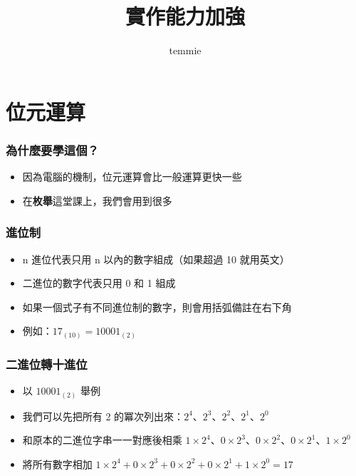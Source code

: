 \documentclass[mathserif]{beamer}
\title{實作能力加強}
\author{temmie}
\date{}
\begin{document}
\begin{frame}
    \titlepage
\end{frame}

\begin{frame}
    \tableofcontents
\end{frame}

\section{位元運算}

\begin{frame}
    \frametitle{為什麼要學這個？}
    \begin{itemize}
        \item 因為電腦的機制，位元運算會比一般運算更快一些
        \item 在\textbf{枚舉}這堂課上，我們會用到很多
    \end{itemize}
\end{frame}

\begin{frame}
    \frametitle{進位制}
    \begin{itemize}
        \item n 進位代表只用 n 以內的數字組成（如果超過 10 就用英文）
        \item 二進位的數字代表只用 0 和 1 組成
        \item<2-> 如果一個式子有不同進位制的數字，則會用括弧備註在右下角
        \item<2-> 例如：$17_{(10)}=10001_{(2)}$
    \end{itemize}
\end{frame}

\begin{frame}
    \frametitle{二進位轉十進位}
    \begin{itemize}
        \item 以 $10001_{(2)}$ 舉例
        \item 我們可以先把所有 2 的冪次列出來：$2^4$、$2^3$、$2^2$、$2^1$、$2^0$
        \item<2-> 和原本的二進位字串一一對應後相乘
        $1\times 2^4$、$0\times 2^3$、$0\times 2^2$、$0\times 2^1$、$1\times 2^0$
        \item<3-> 將所有數字相加
        $1\times 2^4+0\times 2^3+0\times 2^2+0\times 2^1+1\times 2^0=17$
    \end{itemize}
\end{frame}
\end{document}
